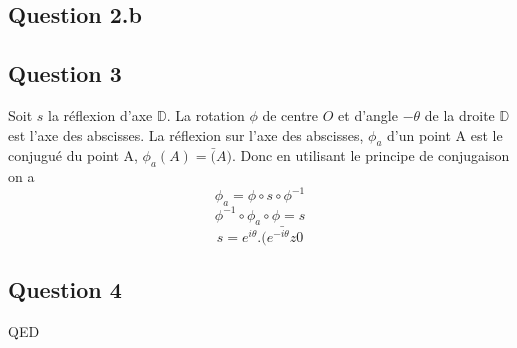 \documentclass[]{book}
\theoremstyle{definition}
\newcommand{\bb}[1]{\mathbb{#1}}
\newcommand{\D}{\bb{D}}
\begin{document}
\subsection*{Question 2.b}

\subsection*{Question 3}
Soit $s$ la r\'eflexion d'axe $\D$.
La rotation $\phi$ de centre $O$ et d'angle $-\theta$ de la droite $\D$ est l'axe des abscisses. La r\'eflexion sur l'axe des abscisses, $\phi_a$  d'un point A est le conjugu\'e du point A, $\phi_a(A) = \bar(A)$. Donc en utilisant le principe de conjugaison on a 
$$\phi_a = \phi \circ s \circ \phi^{-1}$$
$$\phi^{-1} \circ \phi_a \circ \phi = s$$
$$s = e^{i\theta}.\bar{(e^{-i\theta}z0}$$

\subsection*{Question 4}
 





QED
\end{document}

